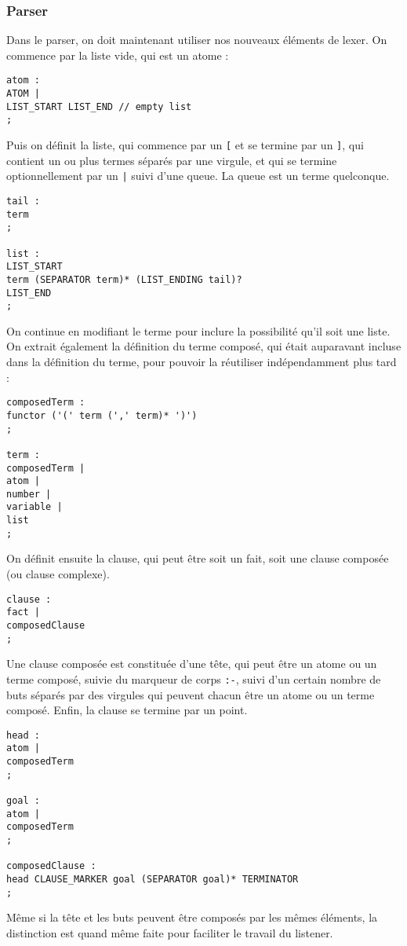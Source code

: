 \documentclass[../report.tex]{subfiles}
\begin{document}
\subsubsection{Parser}
Dans le parser, on doit maintenant utiliser nos nouveaux éléments de lexer. On commence par la liste vide, qui est un atome :
\begin{verbatim}
atom :
ATOM |
LIST_START LIST_END // empty list
;    
\end{verbatim}
Puis on définit la liste, qui commence par un \texttt{[} et se termine par un \texttt{]}, qui contient un ou plus termes séparés par une virgule, et qui se termine optionnellement par un \texttt{|} suivi d'une queue. La queue est un terme quelconque.
\begin{verbatim}
tail :
term
;

list :
LIST_START
term (SEPARATOR term)* (LIST_ENDING tail)?
LIST_END
;
\end{verbatim}
On continue en modifiant le terme pour inclure la possibilité qu'il soit une liste. On extrait également la définition du terme composé, qui était auparavant incluse dans la définition du terme, pour pouvoir la réutiliser indépendamment plus tard :
\begin{verbatim}
composedTerm :
functor ('(' term (',' term)* ')') 
;

term :
composedTerm |
atom | 
number |
variable | 
list
;
\end{verbatim}
On définit ensuite la clause, qui peut être soit un fait, soit une clause composée (ou clause complexe).
\begin{verbatim}
clause :
fact |
composedClause
;    
\end{verbatim}
Une clause composée est constituée d'une tête, qui peut être un atome ou un terme composé, suivie du marqueur de corps \texttt{:-}, suivi d'un certain nombre de buts séparés par des virgules qui peuvent chacun être un atome ou un terme composé. Enfin, la clause se termine par un point.
\begin{verbatim}
head :
atom |
composedTerm
;

goal :
atom |
composedTerm
;

composedClause :
head CLAUSE_MARKER goal (SEPARATOR goal)* TERMINATOR
;
\end{verbatim}
Même si la tête et les buts peuvent être composés par les mêmes éléments, la distinction est quand même faite pour faciliter le travail du listener.
\end{document}
